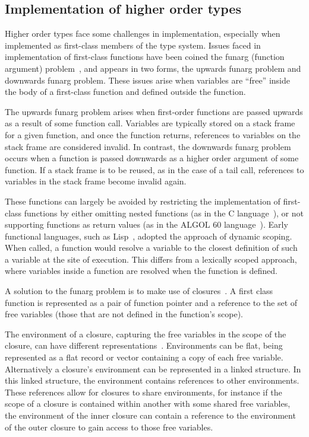 \subsection{Implementation of higher order types}

Higher order types face some challenges in implementation, especially when implemented as first-class members of the type system. Issues faced in implementation of first-class functions have been coined the funarg (function argument) problem~\cite{moses1970function}, and appears in two forms, the upwards funarg problem and downwards funarg problem. These issues arise when variables are ``free'' inside the body of a first-class function and defined outside the function.

The upwards funarg problem arises when first-order functions are passed upwards as a result of some function call. Variables are typically stored on a stack frame for a given function, and once the function returns, references to variables on the stack frame are considered invalid. In contrast, the downwards funarg problem occurs when a function is passed downwards as a higher order argument of some function. If a stack frame is to be reused, as in the case of a tail call, references to variables in the stack frame become invalid again.

These functions can largely be avoided by restricting the implementation of first-class functions by either omitting nested functions (as in the C language~\cite{ritchie1988c}), or not supporting functions as return values (as in the ALGOL 60 language~\cite{backus1960report}). Early functional languages, such as Lisp~\cite{mccarthy1960recursive}, adopted the approach of dynamic scoping. When called, a function would resolve a variable to the closest definition of such a variable at the site of execution. This differs from a lexically scoped approach, where variables inside a function are resolved when the function is defined.

A solution to the funarg problem is to make use of closures~\cite{sandwell1971proposed}. A first class function is represented as a pair of function pointer and a reference to the set of free variables (those that are not defined in the function's scope). 

The environment of a closure, capturing the free variables in the scope of the closure, can have different representations~\cite{appel1989continuation}. Environments can be flat, being represented as a flat record or vector containing a copy of each free variable. Alternatively a closure's environment can be represented in a linked structure. In this linked structure, the environment contains references to other environments. These references allow for closures to share environments, for instance if the scope of a closure is contained within another with some shared free variables, the environment of the inner closure can contain a reference to the environment of the outer closure to gain access to those free variables.

